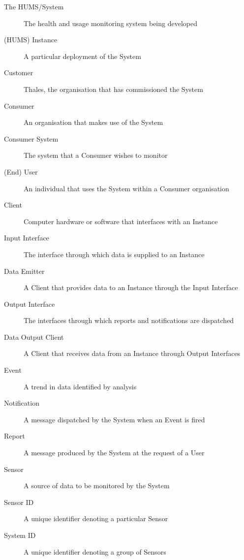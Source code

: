 \documentclass[10pt,a4paper]{article}
\begin{document}
\begin{description}%
	\item[The HUMS/System] The health and usage monitoring system being developed
	\item[(HUMS) Instance] A particular deployment of the System
	\vspace{0.15cm}
	\item[Customer] Thales, the organisation that has commissioned the System
	\item[Consumer] An organisation that makes use of the System
	\item[Consumer System] The system that a Consumer wishes to monitor
	\item[(End) User] An individual that uses the System within a Consumer organisation
	\vspace{0.15cm}
	\item[Client] Computer hardware or software that interfaces with an Instance
	\item[Input Interface] The interface through which data is supplied to an Instance
	\item[Data Emitter] A Client that provides data to an Instance through the Input Interface
	\item[Output Interface] The interfaces through which reports and notifications are dispatched
	\item[Data Output Client] A Client that receives data from an Instance through Output Interfaces
	\vspace{0.15cm}
	\item[Event] A trend in data identified by analysis
	\item[Notification] A message dispatched by the System when an Event is fired
	\item[Report] A message produced by the System at the request of a User
	\vspace{0.14cm}
	\item[Sensor] A source of data to be monitored by the System
	\item[Sensor ID] A unique identifier denoting a particular Sensor
	\item[System ID] A unique identifier denoting a group of Sensors
\end{description}

\end{document}
